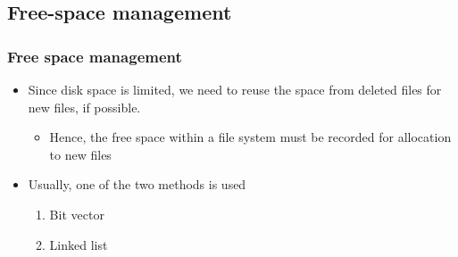 \documentclass[CJKutf8,dvipsnames,table]{beamer}
\begin{document}
\begin{CJK*}{UTF8}{song}
  \subsection{Free-space management}

  \begin{frame}
    \frametitle{Free space management} \pause
    \begin{itemize}\parskip=0pt
    \item Since disk space is limited, we need to reuse the space from deleted files for new files, if possible. \pause
      \begin{itemize}\parskip=0pt
      \item Hence, the free space within a file system must be recorded for allocation to new files \pause
      \end{itemize}
    \item Usually, one of the two methods is used \pause
      \begin{enumerate}\parskip=0pt
      \item Bit vector \pause
      \item Linked list
      \end{enumerate}
    \end{itemize}
  \end{frame}
  

\end{CJK*}
\end{document}
